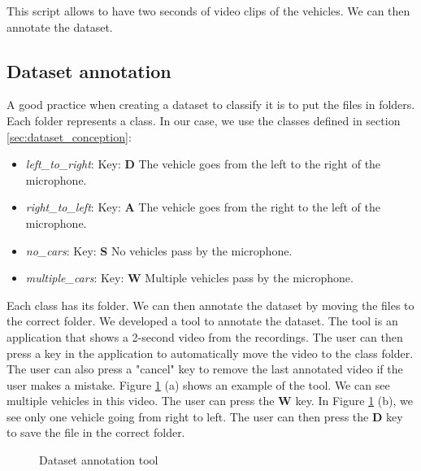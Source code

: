 This script allows to have two seconds of video clips of the vehicles. We can then annotate the dataset.

\subsection{Dataset annotation}

A good practice when creating a dataset to classify it is to put the files in folders. Each folder represents a class. In our case, we use the classes defined in section \ref{sec:dataset_conception}: 

\begin{itemize}
    \item  \textit{left\_to\_right}: Key: \textbf{D} The vehicle goes from the left to the right of the microphone.
    \item  \textit{right\_to\_left}: Key: \textbf{A} The vehicle goes from the right to the left of the microphone.
    \item  \textit{no\_cars}: Key: \textbf{S} No vehicles pass by the microphone.
    \item  \textit{multiple\_cars}: Key: \textbf{W} Multiple vehicles pass by the microphone.
\end{itemize}

Each class has its folder. We can then annotate the dataset by moving the files to the correct folder. We developed a tool to annotate the dataset. The tool is an application that shows a 2-second video from the recordings. The user can then press a key in the application to automatically move the video to the class folder. The user can also press a "cancel" key to remove the last annotated video if the user makes a mistake. Figure \ref{fig:dataset_annotation_tool} (a) shows an example of the tool. We can see multiple vehicles in this video. The user can press the \textbf{W} key. In Figure \ref{fig:dataset_annotation_tool} (b), we see only one vehicle going from right to left. The user can then press the \textbf{D} key to save the file in the correct folder.

\begin{figure}[H]
    \centering
    \qquad
    \caption{Dataset annotation tool}
    \label{fig:dataset_annotation_tool}
\end{figure}

